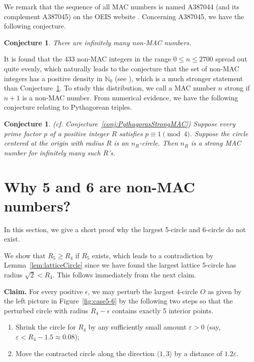 \documentclass{article}
\theoremstyle{theorem}
\newtheorem{conjecture}[theorem]{Conjecture}
\theoremstyle{definition}
\begin{document}
We remark that the sequence of all MAC numbers is named A387044 (and its complement A387045) on the OEIS website \cite{Sloane2025}. Concerning A387045, we have the following conjecture.

\begin{conjecture}\label{conj:nonMAC}
There are infinitely many non-MAC numbers.
\end{conjecture}

It is found that the 433 non-MAC integers in the range $0\le n\le 2700$ spread out quite evenly, which naturally leads to the conjecture that the set of non-MAC integers has a positive density in ${\mathbb N}_0$  (see \cite[Conjecture 3(7)]{Zhao2025Aug}), which is a much stronger statement than Conjecture~\ref{conj:nonMAC}. To study this distribution, we call a MAC number $n$ strong if $n+1$ is a non-MAC number. From numerical evidence, we have the following conjecture relating to Pythagorean triples.

\begin{conjecture}\label{conj:PythagorasStrongMACA} \emph{(cf. Conjecture~\ref{conj:PythagorasStrongMAC})}
Suppose every prime factor $p$ of a positive integer $R$ satisfies $p\equiv 1 \pmod{4}$. Suppose the circle centered at the origin with radius $R$ is an $n_R$-circle. Then $n_R$ is a strong MAC number for infinitely many such $R$'s.
\end{conjecture}


\section{Why 5 and 6 are non-MAC numbers?}\label{sec:Proof56}
In this section, we give a short proof why the largest 5-circle and 6-circle do not exist.

We show that $R_5\ge R_4$ if $R_5$ exists, which leads to a contradiction by Lemma~\ref{lem:latticeCircle} since we have found the largest lattice 5-circle has radius $\sqrt{2}<R_4$. This follows immediately from the next claim.

\medskip
\noindent
\textbf{Claim.} For every positive $\epsilon$, we may perturb the largest 4-circle $O$ as given by the left picture in Figure~\ref{fig:case5-6} by the following two steps so that the perturbed circle with radius $R_4-\epsilon$ contains exactly 5 interior points.
\begin{enumerate}
  \item [(i)] Shrink the circle for $R_4$ by any sufficiently small amount $\varepsilon>0$ (say, $\varepsilon<R_4-1.5\approx 0.08$);
  \item [(ii)] Move the contracted circle along the direction $\langle 1, 3\rangle$ by a distance of $1.2\varepsilon$.
\end{enumerate}
\end{document}
